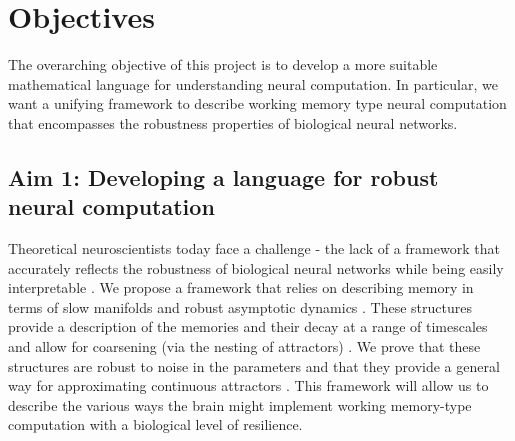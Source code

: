 \documentclass[12pt,letterpaper, onecolumn]{article}
\theoremstyle{definition}
\theoremstyle{remark}
\begin{document}
%


\newpage
\section{Objectives}
The overarching objective of this project is to develop a more suitable mathematical language for understanding neural computation. In particular, we want a unifying framework to describe working memory type neural computation that encompasses the robustness properties of biological neural networks.

\subsection*{Aim 1: Developing a language for robust neural computation}
Theoretical neuroscientists today face a challenge - the lack of a  framework that accurately reflects the robustness of biological neural networks while being easily interpretable \citep{lillicrap2019}.
We propose a framework that relies on describing memory in terms of slow manifolds \citep{ghazizadeh2021slow} and robust asymptotic dynamics \citep{casey1996}.
These structures provide a description of the memories and their decay at a range of timescales \citep{jaeger2023timescales} and allow for coarsening (via the nesting of attractors) \citep{braun2010}.
We prove that these structures are robust to noise in the parameters \citep{Park2023a} and that they provide a general way for approximating continuous attractors \citep{inagaki2019}.
This framework will allow us to describe the various ways the brain might implement working memory-type computation with a biological level of resilience.
\end{document}
